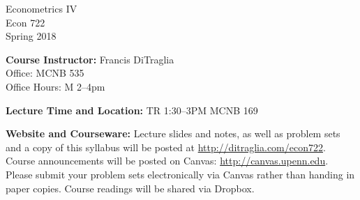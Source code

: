 \documentclass[11pt, letterpaper]{article}
\begin{document}
\thispagestyle{plain}

\begin{center}
\Large
\sc
Econometrics IV\\
\large
Econ 722\\
\large
Spring 2018
\end{center}



\normalsize

\noindent \textbf{Course Instructor:} Francis DiTraglia \\
Office: MCNB 535\\
Office Hours: M 2--4pm 

\medskip

 
\noindent \textbf{Lecture Time and Location:} 
TR 1:30--3PM MCNB 169 

\medskip
 
\noindent \textbf{Website and Courseware:} Lecture slides and notes, as well as problem sets and a copy of this syllabus will be posted at \url{http://ditraglia.com/econ722}.
Course announcements will be posted on Canvas: \url{http://canvas.upenn.edu}.
Please submit your problem sets electronically via Canvas rather than handing in paper copies.
Course readings will be shared via Dropbox.

\medskip
\end{document}
